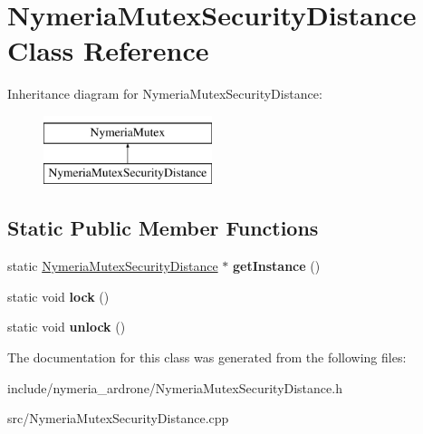 \hypertarget{classNymeriaMutexSecurityDistance}{\section{\-Nymeria\-Mutex\-Security\-Distance \-Class \-Reference}
\label{classNymeriaMutexSecurityDistance}
}
\-Inheritance diagram for \-Nymeria\-Mutex\-Security\-Distance\-:\begin{figure}[H]
\begin{center}
\leavevmode
\includegraphics[height=2.000000cm]{classNymeriaMutexSecurityDistance}
\end{center}
\end{figure}
\subsection*{\-Static \-Public \-Member \-Functions}
\begin{DoxyCompactItemize}
\item 
\hypertarget{classNymeriaMutexSecurityDistance_a7de1c0314682fcdecf8e882eab57362b}{static \*
\hyperlink{classNymeriaMutexSecurityDistance}{\-Nymeria\-Mutex\-Security\-Distance} $\ast$ {\bfseries get\-Instance} ()}\label{classNymeriaMutexSecurityDistance_a7de1c0314682fcdecf8e882eab57362b}

\item 
\hypertarget{classNymeriaMutexSecurityDistance_a983390ed9dcef9b62c3df39f47e5bbe7}{static void {\bfseries lock} ()}\label{classNymeriaMutexSecurityDistance_a983390ed9dcef9b62c3df39f47e5bbe7}

\item 
\hypertarget{classNymeriaMutexSecurityDistance_a13d05cc109b0198a05091f0e2b108db5}{static void {\bfseries unlock} ()}\label{classNymeriaMutexSecurityDistance_a13d05cc109b0198a05091f0e2b108db5}

\end{DoxyCompactItemize}


\-The documentation for this class was generated from the following files\-:\begin{DoxyCompactItemize}
\item 
include/nymeria\-\_\-ardrone/\-Nymeria\-Mutex\-Security\-Distance.\-h\item 
src/\-Nymeria\-Mutex\-Security\-Distance.\-cpp\end{DoxyCompactItemize}
